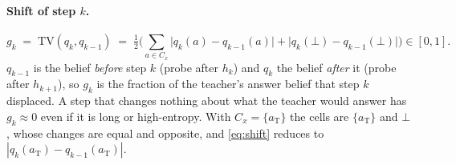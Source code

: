\documentclass[11pt]{article}
\theoremstyle{definition}
\theoremstyle{remark}
\newcommand{\aT}{a_{\mathrm{T}}}
\newcommand{\TV}{\mathrm{TV}}
\newcommand{\other}{\bot}
\begin{document}
\paragraph{Shift of step $k$.}
\begin{equation}
g_k\;=\;\TV(q_k,q_{k-1})\;=\;\tfrac12\Big(\sum_{a\in C_x}\big|q_k(a)-q_{k-1}(a)\big|+\big|q_k(\other)-q_{k-1}(\other)\big|\Big)\in[0,1].
\label{eq:shift}
\end{equation}
$q_{k-1}$ is the belief \emph{before} step $k$ (probe after $h_k$) and $q_k$ the belief \emph{after} it (probe after $h_{k+1}$), so $g_k$ is the fraction of the teacher's answer belief that step $k$ displaced. A step that changes nothing about what the teacher would answer has $g_k\approx0$ even if it is long or high-entropy. With $C_x=\{\aT\}$ the cells are $\{\aT\}$ and $\other$, whose changes are equal and opposite, and \cref{eq:shift} reduces to $|q_k(\aT)-q_{k-1}(\aT)|$.
\end{document}
